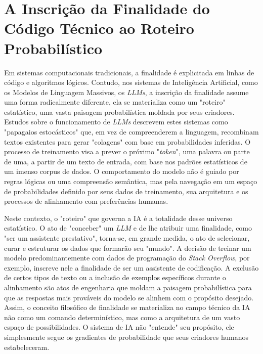 \section{A Inscrição da Finalidade do Código Técnico ao Roteiro Probabilístico}\label{sec:inscricao_finalidade}

Em sistemas computacionais tradicionais, a finalidade é explicitada em linhas de código e algoritmos lógicos. 
Contudo, nos sistemas de Inteligência Artificial, como os Modelos 
de Linguagem Massivos, os \textit{LLMs}, a inscrição da finalidade assume uma forma radicalmente diferente, ela se materializa como um "roteiro" estatístico, uma vasta paisagem 
probabilística moldada por seus criadores. 
Estudos sobre o funcionamento de \textit{LLMs} descrevem estes sistemas como "papagaios estocásticos" \cite{Bender2021} que, em vez de compreenderem a linguagem, 
recombinam textos existentes para gerar "colagens" com base em probabilidades inferidas. 
O processo de treinamento visa a prever o próximo "\textit{token}", uma palavra ou parte de uma, 
a partir de um texto de entrada, com base nos padrões estatísticos de um imenso corpus de dados. 
O comportamento do modelo não é guiado por regras lógicas ou uma compreensão 
semântica, mas pela navegação em um espaço de probabilidades definido por seus dados de treinamento, sua arquitetura e os processos de alinhamento com preferências humanas. 

Neste contexto, o "roteiro" que governa a IA é a totalidade desse universo estatístico. 
O ato de "conceber" um \textit{LLM} e de lhe atribuir uma finalidade, como "ser um assistente 
prestativo", torna-se, em grande medida, o ato de selecionar, curar e estruturar os dados que formarão seu "mundo". 
A decisão de treinar um modelo predominantemente com dados 
de programação do \textit{Stack Overflow}, por exemplo, inscreve nele a finalidade de ser um assistente de codificação. 
A exclusão de certos tipos de texto ou a inclusão de exemplos 
específicos durante o alinhamento são atos de engenharia que moldam a paisagem probabilística para que as respostas mais prováveis do modelo se alinhem com o propósito desejado. 
Assim, o conceito filosófico de finalidade se materializa no campo técnico da IA não como um comando determinístico, mas como a arquitetura de um vasto espaço de possibilidades. 
O sistema de IA não "entende" seu propósito, ele simplesmente segue os gradientes de probabilidade que seus criadores humanos estabeleceram. 

